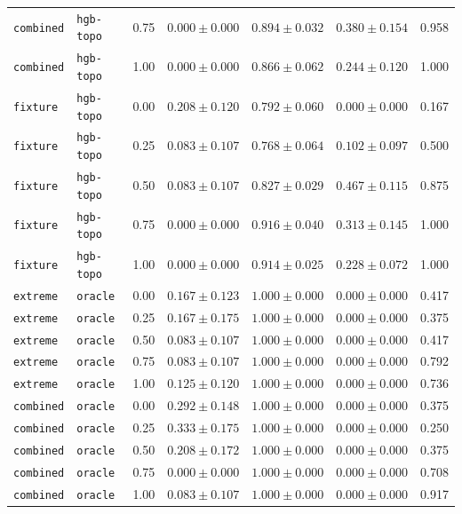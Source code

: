 \documentclass{article}
\begin{document}
\begin{center}
\begin{tabular}{lllcccc}
\texttt{combined} & \texttt{hgb-topo} & 0.75 & $0.000 \pm 0.000$ & $0.894 \pm 0.032$ & $0.380 \pm 0.154$ & 0.958 \\
\texttt{combined} & \texttt{hgb-topo} & 1.00 & $0.000 \pm 0.000$ & $0.866 \pm 0.062$ & $0.244 \pm 0.120$ & 1.000 \\
\texttt{fixture} & \texttt{hgb-topo} & 0.00 & $0.208 \pm 0.120$ & $0.792 \pm 0.060$ & $0.000 \pm 0.000$ & 0.167 \\
\texttt{fixture} & \texttt{hgb-topo} & 0.25 & $0.083 \pm 0.107$ & $0.768 \pm 0.064$ & $0.102 \pm 0.097$ & 0.500 \\
\texttt{fixture} & \texttt{hgb-topo} & 0.50 & $0.083 \pm 0.107$ & $0.827 \pm 0.029$ & $0.467 \pm 0.115$ & 0.875 \\
\texttt{fixture} & \texttt{hgb-topo} & 0.75 & $0.000 \pm 0.000$ & $0.916 \pm 0.040$ & $0.313 \pm 0.145$ & 1.000 \\
\texttt{fixture} & \texttt{hgb-topo} & 1.00 & $0.000 \pm 0.000$ & $0.914 \pm 0.025$ & $0.228 \pm 0.072$ & 1.000 \\
\texttt{extreme} & \texttt{oracle} & 0.00 & $0.167 \pm 0.123$ & $1.000 \pm 0.000$ & $0.000 \pm 0.000$ & 0.417 \\
\texttt{extreme} & \texttt{oracle} & 0.25 & $0.167 \pm 0.175$ & $1.000 \pm 0.000$ & $0.000 \pm 0.000$ & 0.375 \\
\texttt{extreme} & \texttt{oracle} & 0.50 & $0.083 \pm 0.107$ & $1.000 \pm 0.000$ & $0.000 \pm 0.000$ & 0.417 \\
\texttt{extreme} & \texttt{oracle} & 0.75 & $0.083 \pm 0.107$ & $1.000 \pm 0.000$ & $0.000 \pm 0.000$ & 0.792 \\
\texttt{extreme} & \texttt{oracle} & 1.00 & $0.125 \pm 0.120$ & $1.000 \pm 0.000$ & $0.000 \pm 0.000$ & 0.736 \\
\texttt{combined} & \texttt{oracle} & 0.00 & $0.292 \pm 0.148$ & $1.000 \pm 0.000$ & $0.000 \pm 0.000$ & 0.375 \\
\texttt{combined} & \texttt{oracle} & 0.25 & $0.333 \pm 0.175$ & $1.000 \pm 0.000$ & $0.000 \pm 0.000$ & 0.250 \\
\texttt{combined} & \texttt{oracle} & 0.50 & $0.208 \pm 0.172$ & $1.000 \pm 0.000$ & $0.000 \pm 0.000$ & 0.375 \\
\texttt{combined} & \texttt{oracle} & 0.75 & $0.000 \pm 0.000$ & $1.000 \pm 0.000$ & $0.000 \pm 0.000$ & 0.708 \\
\texttt{combined} & \texttt{oracle} & 1.00 & $0.083 \pm 0.107$ & $1.000 \pm 0.000$ & $0.000 \pm 0.000$ & 0.917 \\

\end{tabular}
\end{center}
\end{document}
